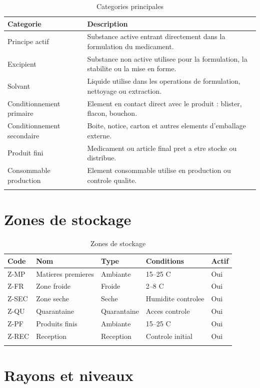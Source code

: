 \documentclass[11pt,a4paper]{article}
\begin{document}
\begin{longtable}{|p{4cm}|p{9cm}|}
\hline
\textbf{Categorie} & \textbf{Description} \\
\hline
Principe actif & Substance active entrant directement dans la formulation du medicament. \\
\hline
Excipient & Substance non active utilisee pour la formulation, la stabilite ou la mise en forme. \\
\hline
Solvant & Liquide utilise dans les operations de formulation, nettoyage ou extraction. \\
\hline
Conditionnement primaire & Element en contact direct avec le produit : blister, flacon, bouchon. \\
\hline
Conditionnement secondaire & Boite, notice, carton et autres elements d'emballage externe. \\
\hline
Produit fini & Medicament ou article final pret a etre stocke ou distribue. \\
\hline
Consommable production & Element consommable utilise en production ou controle qualite. \\
\hline
\caption{Categories principales}
\end{longtable}

\section{Zones de stockage}

\begin{longtable}{|p{2cm}|p{3cm}|p{3cm}|p{3cm}|p{2cm}|}
\hline
\textbf{Code} & \textbf{Nom} & \textbf{Type} & \textbf{Conditions} & \textbf{Actif} \\
\hline
Z-MP & Matieres premieres & Ambiante & 15--25 C & Oui \\
\hline
Z-FR & Zone froide & Froide & 2--8 C & Oui \\
\hline
Z-SEC & Zone seche & Seche & Humidite controlee & Oui \\
\hline
Z-QU & Quarantaine & Quarantaine & Acces controle & Oui \\
\hline
Z-PF & Produits finis & Ambiante & 15--25 C & Oui \\
\hline
Z-REC & Reception & Reception & Controle initial & Oui \\
\hline
\caption{Zones de stockage}
\end{longtable}

\section{Rayons et niveaux}
\end{document}
